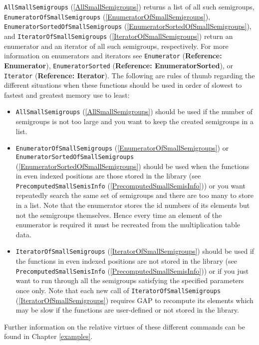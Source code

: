 \documentclass[a4paper,11pt]{report}
\begin{document}
{{\begin{Verbatim}[commandchars=!@|,fontsize=\small,frame=single,label=Example]
\end{Verbatim}
 \texttt{AllSmallSemigroups} (\ref{AllSmallSemigroups}) returns a list of all such semigroups, \texttt{EnumeratorOfSmallSemigroups} (\ref{EnumeratorOfSmallSemigroups}), \texttt{EnumeratorSortedOfSmallSemigroups} (\ref{EnumeratorSortedOfSmallSemigroups}), and \texttt{IteratorOfSmallSemigroups} (\ref{IteratorOfSmallSemigroups}) return an enumerator and an iterator of all such semigroups, respectively. For
more information on enumerators and iterators see \texttt{Enumerator} (\textbf{Reference: Enumerator}), \texttt{EnumeratorSorted} (\textbf{Reference: EnumeratorSorted}), or \texttt{Iterator} (\textbf{Reference: Iterator}). The following are rules of thumb regarding the different situations when
these functions should be used in order of slowest to fastest and greatest
memory use to least: 
\begin{itemize}
\item \texttt{AllSmallSemigroups} (\ref{AllSmallSemigroups}) should be used if the number of semigroups is not too large and you want to
keep the created semigroups in a list. 
\item \texttt{EnumeratorOfSmallSemigroups} (\ref{EnumeratorOfSmallSemigroups}) or \texttt{EnumeratorSortedOfSmallSemigroups} (\ref{EnumeratorSortedOfSmallSemigroups}) should be used when the functions in even indexed positions are those stored
in the library (see \texttt{PrecomputedSmallSemisInfo} (\ref{PrecomputedSmallSemisInfo})) or you want repeatedly search the same set of semigroups and there are too
many to store in a list. Note that the enumerator stores the id numbers of its
elements but not the semigroups themselves. Hence every time an element of the
enumerator is required it must be recreated from the multiplication table
data. 
\item \texttt{IteratorOfSmallSemigroups} (\ref{IteratorOfSmallSemigroups}) should be used if the functions in even indexed positions are not stored in
the library (see \texttt{PrecomputedSmallSemisInfo} (\ref{PrecomputedSmallSemisInfo})) or if you just want to run through all the semigroups satisfying the
specified parameters once only. Note that each new call of \texttt{IteratorOfSmallSemigroups} (\ref{IteratorOfSmallSemigroups}) requires \textsf{GAP} to recompute its elements which may be slow if the functions are user-defined
or not stored in the library.
\end{itemize}
 Further information on the relative virtues of these different commands can be
found in Chapter \ref{examples}.

}}
\end{document}
